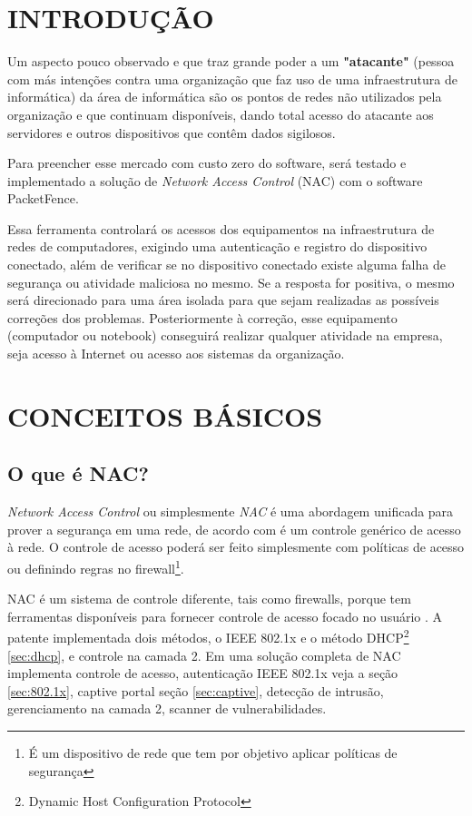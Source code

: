 \documentclass[12pt, brazil, ruledheader, pnumromarab,normaltoc]{abnt}
\begin{document}
\chapter{INTRODUÇÃO}
Um aspecto pouco observado e que traz grande poder a um \textbf{"atacante"} (pessoa com más intenções contra uma organização que faz uso de uma infraestrutura de informática) da área de informática são os pontos de redes não utilizados pela organização e que continuam disponíveis, dando total acesso do atacante aos servidores e outros dispositivos que contêm dados sigilosos.
\par
Para preencher esse mercado com custo zero do software, será testado e implementado a solução de \textit{Network Access Control} (NAC) com o software PacketFence.
\par
Essa ferramenta controlará os acessos dos equipamentos na infraestrutura de redes de computadores, exigindo uma autenticação e registro do dispositivo conectado, além de verificar se no dispositivo conectado existe alguma falha de segurança ou atividade maliciosa no mesmo. Se a resposta for positiva, o mesmo será direcionado para uma área isolada para que sejam realizadas as possíveis correções dos problemas. Posteriormente à correção, esse equipamento (computador ou notebook) conseguirá realizar qualquer atividade na empresa, seja acesso à Internet ou acesso aos sistemas da organização.

\chapter{CONCEITOS BÁSICOS}
\section{O que é NAC?}
\emph{Network Access Control} ou simplesmente \emph{NAC} é uma abordagem unificada para prover a segurança em uma rede, de acordo com \cite{interop-nac} é um controle genérico de acesso à rede. O controle de acesso poderá ser feito simplesmente com políticas de acesso ou definindo regras no firewall\footnote{É um dispositivo de rede que tem por objetivo aplicar políticas de segurança}.
\par
NAC é um sistema de controle diferente, tais como firewalls, porque tem ferramentas disponíveis para fornecer controle de acesso focado no usuário \cite{interop-nac}. A patente \cite{nac} implementada dois métodos, o IEEE 802.1x \cite{802.1x} e o método DHCP\footnote{Dynamic Host Configuration Protocol} \ref{sec:dhcp}, e controle na camada 2. Em uma solução completa de NAC \cite{nac} implementa controle de acesso, autenticação IEEE 802.1x veja a seção \ref{sec:802.1x}, captive portal seção \ref{sec:captive}, detecção de intrusão, gerenciamento na camada 2, scanner de vulnerabilidades. 
\end{document}

